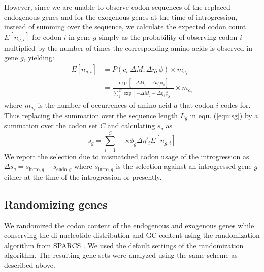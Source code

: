 \documentclass[doublespacing,linenumbers]{bmcart-modified}
\newcommand{\GC}{GC content\xspace}
\newcommand{\DM}{\ensuremath{{\Delta M}}\xspace}
\newcommand{\DE}{\ensuremath{{\Delta \eta}}\xspace}
\newcommand{\GL}{\ensuremath{{\Delta s}}\xspace}
\begin{document}
However, since we are unable to observe codon sequences of the replaced endogenous genes and for the exogenous genes at the time of introgression, instead of summing over the sequence, we calculate the expected codon count $E[n_{g,i}] $ for codon $i$ in gene $g$ simply as the probability of observing codon $i$ multiplied by the number of times the corresponding amino acids is observed in gene $g$, yielding:
\begin{align*}
E[n_{g,i}] &= P(c_i | \DM, \DE, \phi) \times m_{a_i}\\
 &= \frac{\exp[-\DM_i -\DE_i\phi_g]}{\sum_j^C \exp[-\DM_j -\DE_j\phi_g]}\times m_{a_i}
\end{align*} 
where $m_{a_i}$ is the number of occurrences of amino acid $a$ that codon $i$ codes for.
Thus replacing the summation over the sequence length $L_g$ in equ. (\ref{equ:sg}) by a summation over the codon set $C$ and calculating $s_g$ as
\begin{equation}
s_g = \sum_{i=1}^{C} -\kappa \phi_g \DE'_i E[n_{g,i}] 
\end{equation}
We report the selection due to mismatched codon usage of the introgression as $\GL_g = s_{\text{intro},g} - s_{\text{endo},g}$ where $s_{\text{intro},g}$ is the selection against an introgressed gene $g$ either at the time of the introgression or presently.

\subsection*{Randomizing genes}

We randomized the codon content of the endogenous and exogenous genes while conserving the di-nucleotide distribution and \GC using the randomization algorithm from SPARCS \citep{zhang2013}.
We used the default settings of the randomization algorithm.
The resulting gene sets were analyzed using the same scheme as described above. 
\end{document}
